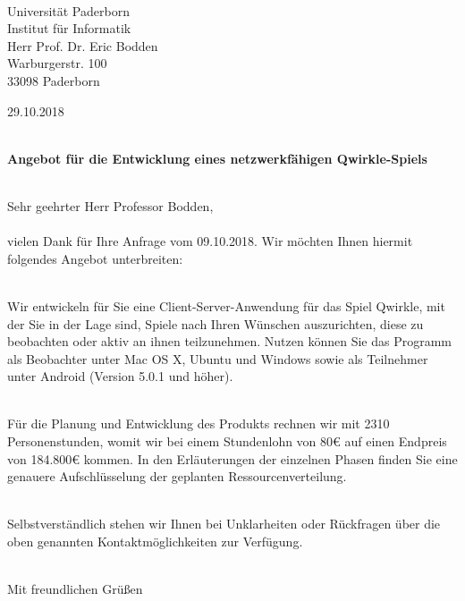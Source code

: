 \documentclass[11pt, a4paper]{letter} %
\begin{document}
\begin{letter}{

	\ \\
	Universität Paderborn\\
	Institut für Informatik\\
	Herr Prof. Dr. Eric Bodden\\
	Warburgerstr. 100\\
	33098 Paderborn
}


\opening{}
\begin{flushright}
29.10.2018
\end{flushright}
\ \\\textbf{Angebot für die Entwicklung eines netzwerkfähigen Qwirkle-Spiels}

\ \\Sehr geehrter Herr Professor Bodden,
\ \\
\ \\vielen Dank für Ihre Anfrage vom 09.10.2018. Wir möchten Ihnen hiermit folgendes Angebot unterbreiten: 

\ \\Wir entwickeln für Sie eine Client-Server-Anwendung für das Spiel Qwirkle, mit der Sie in der Lage sind, Spiele nach Ihren Wünschen auszurichten, diese zu beobachten oder aktiv an ihnen teilzunehmen. Nutzen können Sie das Programm als Beobachter unter Mac OS X, Ubuntu und Windows sowie als Teilnehmer unter Android (Version 5.0.1 und höher).

\ \\Für die Planung und Entwicklung des Produkts rechnen wir mit 2310 Personenstunden, womit wir bei einem Stundenlohn von 80€ auf einen Endpreis von 184.800€ kommen. In den Erläuterungen der einzelnen Phasen finden Sie eine genauere Aufschlüsselung der geplanten Ressourcenverteilung.

\ \\Selbstverständlich stehen wir Ihnen bei Unklarheiten oder Rückfragen über die oben genannten Kontaktmöglichkeiten zur Verfügung.

\ \\Mit freundlichen Grüßen


\end{letter}
\end{document}
